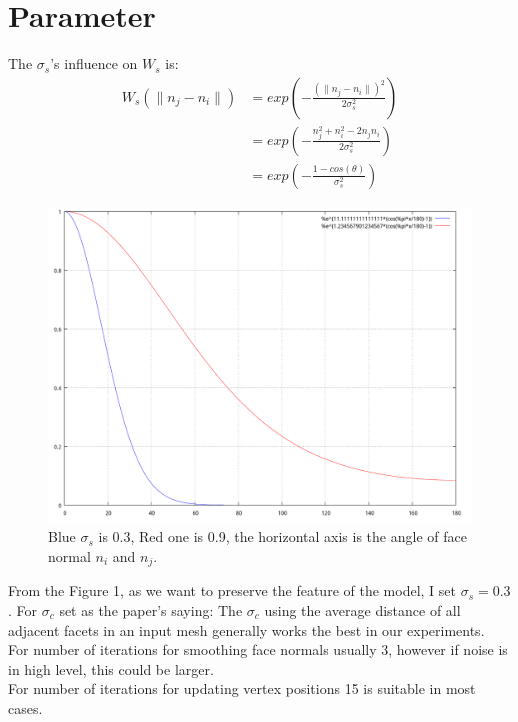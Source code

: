 \documentclass{article}
\theoremstyle{definition}
\theoremstyle{remark}
\begin{document}
\section{Parameter}
The $\sigma_s$'s influence on $W_s$ is:
\begin{equation}
  \begin{aligned}
      W_s(\parallel n_j-n_i \parallel) &= exp(-\frac{(\parallel n_j-n_i \parallel)^2} {2\sigma_s^2})\\
      &= exp(-\frac{n_j^2 + n_i^2  - 2n_jn_i} {2\sigma_s^2}) \\
      &=exp(-\frac{1-cos(\theta)} {\sigma_s^2})
   \end{aligned}
\end{equation}
\begin{figure}[H]
\includegraphics[width=12cm]{theta_inf}
 \caption[The $\sigma_s$'s influence on $W_s$]
   {Blue $\sigma_s$ is 0.3, Red one is 0.9, the horizontal axis is the angle of face normal $n_i$ and $n_j$.}
\centering
\end{figure}
From the Figure 1, as we want to preserve the feature of the model, I set $\sigma_s = 0.3$. For $\sigma_c$ set as the paper's saying: The $\sigma_c$  using the average distance of all adjacent facets in an input mesh generally works the best in our experiments. \\
For number of iterations for smoothing face normals usually 3, however if noise is in high level, this could be larger.\\
For number of iterations for updating vertex positions 15 is suitable in most cases.
\end{document}
